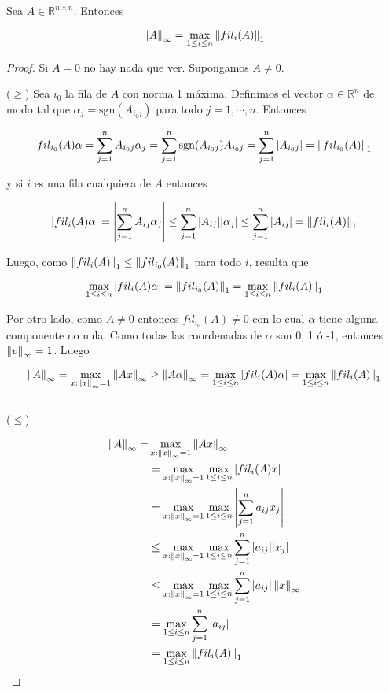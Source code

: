 \begin{propo}
\label{propo:normainf}
Sea $A \in \mathbb{R}^{n \times n}$. Entonces

\[\left\lVert A\right\rVert_{\infty} = \max\limits_{1 \leq i \leq n} \left\lVert fil_i(A)\right\rVert_1\]

\begin{proof} Si $A = 0$ no hay nada que ver. Supongamos $A \neq 0$.

($\geq$) Sea $i_0$ la fila de $A$ con norma 1 máxima. Definimos el vector $\alpha \in \mathbb{R}^n$ de modo tal que $\alpha_j = \text{sgn}(A_{i_0j})$ para todo $j = 1, \cdots, n$. Entonces

\[fil_{i_0}(A)\alpha = \sum_{j = 1}^n A_{i_0j}\alpha_j = \sum_{j = 1}^n \text{sgn}(A_{i_0j})A_{i_0j} = \sum_{j = 1}^n |A_{i_0j}| = \left\lVert fil_{i_0}(A)\right\rVert_1\]

y si $i$ es una fila cualquiera de $A$ entonces

\[|fil_{i}(A)\alpha| = \left|\sum_{j = 1}^n A_{ij}\alpha_j\right| \leq \sum_{j = 1}^n |A_{ij}||\alpha_j| \leq \sum_{j = 1}^n |A_{ij}| = \left\lVert fil_{i}(A)\right\rVert_1\]

Luego, como $\left\lVert fil_i(A)\right\rVert_1 \leq \left\lVert fil_{i_0}(A)\right\rVert_1$ para todo $i$, resulta que

\[\max\limits_{1 \leq i \leq n}|fil_i(A)\alpha| = \left\lVert fil_{i_0}(A)\right\rVert_1 = \max\limits_{1 \leq i \leq n} \left\lVert fil_i(A)\right\rVert_1\]

Por otro lado, como $A \neq 0$ entonces $fil_{i_0}(A) \neq 0$ con lo cual $\alpha$ tiene alguna componente no nula. Como todas las coordenadas de $\alpha$ son 0, 1 ó -1, entonces $\left\lVert v\right\rVert_{\infty} = 1$. Luego

\[\left\lVert A\right\rVert_{\infty} = \max\limits_{x : \left\lVert x\right\rVert_{\infty} = 1} \left\lVert Ax\right\rVert_{\infty} \geq \left\lVert A\alpha\right\rVert_{\infty} = \max\limits_{1 \leq i \leq n} |fil_i(A)\alpha| = \max\limits_{1 \leq i \leq n} \left\lVert fil_i(A)\right\rVert_1\]
\\[0.25cm]
($\leq$)

\begin{align*}
\left\lVert A\right\rVert_{\infty} = &\max\limits_{x : \left\lVert x\right\rVert_{\infty} = 1} \left\lVert Ax\right\rVert_{\infty}\\
& =\max\limits_{x : \left\lVert x\right\rVert_{\infty} = 1} \max\limits_{1 \leq i \leq n} |fil_i(A)x|\\
& = \max\limits_{x : \left\lVert x\right\rVert_{\infty} = 1} \max\limits_{1 \leq i \leq n} \left|\sum_{j = 1}^n a_{ij} x_j\right|\\
& \leq \max\limits_{x : \left\lVert x\right\rVert_{\infty} = 1} \max\limits_{1 \leq i \leq n} \sum_{j = 1}^n |a_{ij}||x_j|\\
& \leq \max\limits_{x : \left\lVert x\right\rVert_{\infty} = 1} \max\limits_{1 \leq i \leq n} \sum_{j = 1}^n |a_{ij}|\left\lVert x\right\rVert_{\infty}\\
& = \max\limits_{1 \leq i \leq n} \sum_{j = 1}^n |a_{ij}|\\
& = \max\limits_{1 \leq i \leq n} \left\lVert fil_i(A)\right\rVert_1
\end{align*}
\end{proof}

\end{propo}

